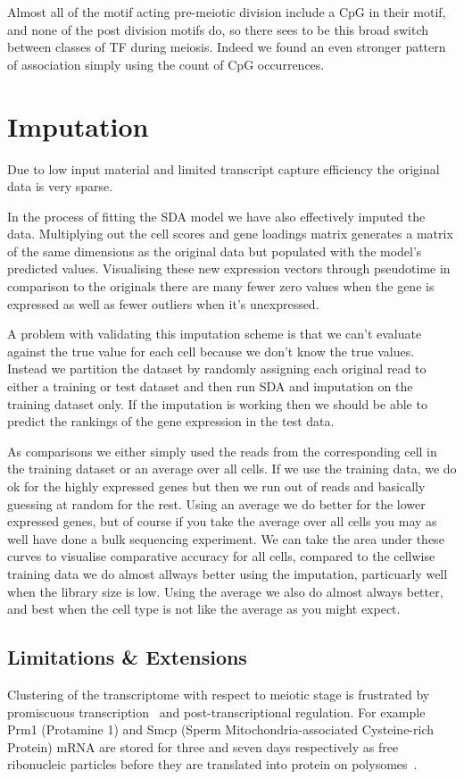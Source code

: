 Almost all of the motif acting pre-meiotic division include a CpG in their motif, and none of the post division motifs do, so there sees to be this broad switch between classes of TF during meiosis. Indeed we found an even stronger pattern of association simply using the count of CpG occurrences.


\section{Imputation}

Due to low input material and limited transcript capture efficiency the original data is very sparse. 

In the process of fitting the SDA model we have also effectively imputed the data. Multiplying out the cell scores and gene loadings matrix generates a matrix of the same dimensions as the original data but populated with the model's predicted values. Visualising these new expression vectors through pseudotime in comparison to the originals there are many fewer zero values when the gene is expressed as well as fewer outliers when it's unexpressed.

A problem with validating this imputation scheme is that we can't evaluate against the true value for each cell because we don't know the true values. Instead we partition the dataset by randomly assigning each original read to either a training or test dataset and then run SDA and imputation on the training dataset only. If the imputation is working then we should be able to predict the rankings of the gene expression in the test data.



As comparisons we either simply used the reads from the corresponding cell in the training dataset or an average over all cells. If we use the training data, we do ok for the highly expressed genes but then we run out of reads and basically guessing at random for the rest. Using an average we do better for the lower expressed genes, but of course if you take the average over all cells you may as well have done a bulk sequencing experiment. We can take the area under these curves to visualise comparative accuracy for all cells, compared to the cellwise training data we do almost allways better using the imputation, particuarly well when the library size is low. Using the average we also do almost always better, and best when the cell type is not like the average as you might expect.


\subsection{Limitations \& Extensions}
Clustering of the transcriptome with respect to meiotic stage is frustrated by promiscuous transcription~\cite{Soumillon2013Cellular} and post-transcriptional regulation. For example Prm1 (Protamine 1) and Smcp (Sperm Mitochondria-associated Cysteine-rich Protein) mRNA are stored for three and seven days respectively as free ribonucleic particles before they are translated into protein on polysomes~\cite{Cullinane2015Mechanisms, Kleene1984Translational, Kleene2004Patterns}.


